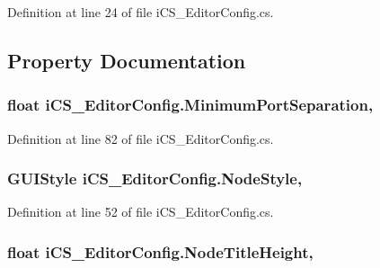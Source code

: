 Definition at line 24 of file i\+C\+S\+\_\+\+Editor\+Config.\+cs.



\subsection{Property Documentation}
\hypertarget{classi_c_s___editor_config_abe5f6af97b545c4059214275f460db88}{
\subsubsection[{Minimum\+Port\+Separation}]{\setlength{\rightskip}{0pt plus 5cm}float i\+C\+S\+\_\+\+Editor\+Config.\+Minimum\+Port\+Separation\hspace{0.3cm}{\ttfamily [static]}, {\ttfamily [get]}}}\label{classi_c_s___editor_config_abe5f6af97b545c4059214275f460db88}


Definition at line 82 of file i\+C\+S\+\_\+\+Editor\+Config.\+cs.

\hypertarget{classi_c_s___editor_config_a7bcc1384ccfe1516cfc040d4515b6e67}{
\subsubsection[{Node\+Style}]{\setlength{\rightskip}{0pt plus 5cm}G\+U\+I\+Style i\+C\+S\+\_\+\+Editor\+Config.\+Node\+Style\hspace{0.3cm}{\ttfamily [static]}, {\ttfamily [get]}}}\label{classi_c_s___editor_config_a7bcc1384ccfe1516cfc040d4515b6e67}


Definition at line 52 of file i\+C\+S\+\_\+\+Editor\+Config.\+cs.

\hypertarget{classi_c_s___editor_config_a7766ea6dc8d786c7b09c4ab5db836310}{
\subsubsection[{Node\+Title\+Height}]{\setlength{\rightskip}{0pt plus 5cm}float i\+C\+S\+\_\+\+Editor\+Config.\+Node\+Title\+Height\hspace{0.3cm}{\ttfamily [static]}, {\ttfamily [get]}}}\label{classi_c_s___editor_config_a7766ea6dc8d786c7b09c4ab5db836310}


